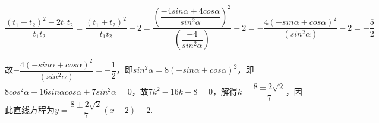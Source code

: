 \begin{enumerate}
\begin{jieda}
            $\dfrac{(t_1+t_2)^2 - 2t_1t_2}{t_1t_2} = \dfrac{(t_1+t_2)^2}{t_1t_2} - 2 = \dfrac{\left(\dfrac{-4sin\alpha + 4cos\alpha}{sin^2\alpha}\right)^2}{\left(\dfrac{-4}{sin^2\alpha}\right)} - 2 = -\dfrac{4(-sin\alpha + cos\alpha)^2}{(sin^2\alpha)} - 2 = -\dfrac{5}{2}$

            故$-\dfrac{4(-sin\alpha + cos\alpha)^2}{(sin^2\alpha)} = -\dfrac{1}{2}$，即$sin^2\alpha = 8(-sin\alpha + cos\alpha)^2$，即$8cos^2\alpha - 16sin\alpha cos\alpha + 7sin^2\alpha = 0$，故$7k^2 - 16k + 8 = 0$，解得$k = \dfrac{8\pm 2\sqrt{2}}{7}$，因此直线方程为$y = \dfrac{8\pm 2\sqrt{2}}{7}(x-2)+2$.
    \end{jieda}
    
    \begin{vspace_}
    \vsp[5]
    \end{vspace_}
\end{enumerate}
